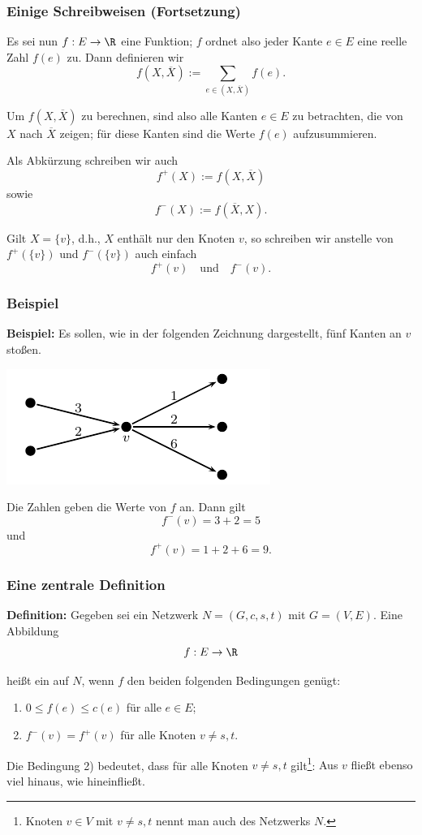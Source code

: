 \documentclass[smaller]{beamer}
\begin{document}
\begin{frame}
 \frametitle{Einige Schreibweisen (Fortsetzung)}
 Es sei nun $f: E \rightarrow \R$ eine Funktion; $f$ ordnet also jeder Kante $e \in E$ eine reelle Zahl $f(e)$ zu. Dann definieren wir
\[
f(X,\overline{X}) := \sum\limits_{e \in (X,\overline{X})}{f(e)}.
\]

Um $f(X,\overline{X})$ zu berechnen, sind also alle Kanten $e \in E$ zu betrachten, die von $X$ nach $\overline{X}$ zeigen; für diese Kanten sind die Werte $f(e)$ aufzusummieren. \\ \vspace*{0.2cm}

Als \alert{Abkürzung} schreiben wir auch
\[
f^+(X) := f(X,\overline{X})
\]
sowie
\[
f^-(X) := f(\overline{X},X).
\]

Gilt $X = \bigl\{ v \bigr\}$, d.h., $X$ enthält nur den Knoten $v$, so schreiben wir anstelle von $f^+\left(\big\{ v \big\}\right)$ und $f^-\left(\big\{ v \big\}\right)$ auch einfach 
\[
f^+(v) \quad \text{und} \quad f^-(v).
\] 
\end{frame}

\begin{frame}
 \frametitle{Beispiel}
 \textbf{Beispiel:} Es sollen, wie in der folgenden Zeichnung dargestellt, fünf Kanten an $v$ stoßen.
 \begin{center}
  \includegraphics{fig9.pdf}
 \end{center}
Die Zahlen geben die Werte von $f$ an. Dann gilt
\[
f^-(v) = 3+2 = 5
\]
und
\[
f^+(v) = 1+2+6 = 9.
\]
\end{frame}

\begin{frame}
 \frametitle{Eine zentrale Definition}
 \textbf{Definition:} Gegeben sei ein Netzwerk $N=(G,c,s,t)$ mit $G=(V,E)$. Eine Abbildung
\[
f: E \rightarrow \R
\]

heißt ein  auf $N$, wenn $f$ den beiden folgenden Bedingungen genügt:
\begin{enumerate}[1)]
\item $0 \leq f(e) \leq c(e)$ für alle $e \in E$;
\item $f^-(v) = f^+(v)$ für alle Knoten $v \neq s,t$.
\end{enumerate}

Die Bedingung 2) bedeutet, dass für alle Knoten $v \neq s,t$ gilt\footnote{Knoten $v \in V$ mit $v\neq s,t$ nennt man auch  des Netzwerks $N$.}: \alert{Aus $v$ fließt ebenso viel hinaus, wie hineinfließt}.
\end{frame}
\end{document}
